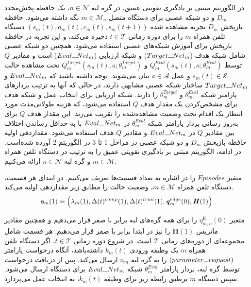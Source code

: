 در الگوریتم مبتنی بر یادگیری تقویتی عمیق، در گره لبه $n \in \mathcal{N}$، یک حافظه پخش‌مجدد $D_m$ و دو شبکه عصبی برای دستگاه متصل $m \in \mathcal{M}_n$ نگه داشته می‌شود. حافظه بازپخش $D_m$ تجربه مشاهده شده $(s_m(t), a_m(t), c_m(t), s_m(t+1))$ دستگاه تلفن همراه $m$ را برای دوره زمانی $t \in \mathcal{T}$ ذخیره می‌کند، و این تجربه در حافظه بازپخش برای آموزش شبکه‌های عصبی استفاده می‌شود. همچنین دو شبکه عصبی شامل شبکه هدف ($Target\rule{0.25cm}{0.15mm}Net_m$) و شبکه ارزیابی ($Eval\rule{0.25cm}{0.15mm}Net_m$) است و مقادیر $Q$ توسط $Q_m^{Eval}(s_m(t), a; \theta_m^{Eval})$ و $Q_m^{Target}(s_m(t), a; \theta_m^{Target})$ تحت مشاهده حالت $s_m(t) \in \mathcal{S}$ و عمل $a \in \mathcal{A}$ بیان می‌شوند. توجه داشته باشید که $Eval\rule{0.25cm}{0.15mm}Net_m$ و $Target\rule{0.25cm}{0.15mm}Net_m$ ساختار شبکه عصبی مشابهی دارند، در حالی که آنها به ترتیب بردارهای پارامتر شبکه $\theta_m^{Eval}$ و $ \theta_m^{Target}$ را دارند. شبکه ارزیابی برای انتخاب عمل و شبکه هدف برای مشخص‌کردن یک مقدار هدف $Q$ استفاده می‌شود، که هزینه طولانی‌مدت مورد انتظار یک اقدام تحت وضعیت مشاهده‌شده را تقریب می‌زند. این مقدار هدف $Q$ برای به‌روز رسانی بردار پارامتر شبکه $\theta_m^{Eval}$ در  $Eval\rule{0.25cm}{0.15mm}Net_m$ با به حداقل رساندن اختلاف بین مقادیر $Q$ در $Eval\rule{0.25cm}{0.15mm}Net_m$ و مقادیر $Q$ هدف استفاده می‌شود. مقداردهی اولیه حافظه بازپخش $D_m$ و دو شبکه عصبی در مراحل $1$ تا $3$ در الگوریتم $2$ آورده شده‌است. در ادامه، الگوریتم مبتنی بر یادگیری تقویتی عمیق را به ترتیب در دستگاه تلفن همراه $m \in \mathcal{M}$ و گره لبه $n \in \mathcal{N}$ ارائه می‌کنیم.


متغیر $Episodes$ را در اشاره به تعداد قسمت‌ها تعریف می‌کنیم. در ابتدای هر قسمت، دستگاه تلفن همراه $m \in \mathcal{M}$، وضعیت حالت را مطابق زیر مقداردهی اولیه می‌کند.
\begin{alignat}{2}
	\textbf{s}_m(1)=\Big(\lambda_m(1), \Delta(t)^{comp}(1), \Delta(t)^{tran}(1), \textbf{\textit{q}}_m^{edge}(0), \textbf{\textit{H}}(1) \Big)
	\label{61}  
\end{alignat} 



متغیر $\eta_{m,n}^{\text{E}}(0)$ را برای همه گره‌های لبه برابر با صفر قرار می‌دهیم و همچنین مقادیر ماتریس $\textbf{H}(1)$ را نیز در ابتدا برابر با صفر قرار می‌دهیم. هر قسمت شامل مجموعه‌ای از دوره‌های زمانی $\mathcal{T}$ است. 
در شروع دوره زمانی $t \in \mathcal{T}$، اگر دستگاه تلفن همراه $m$ یک وظیفه ورودی $k_m(t)$ داشته‌باشد، آنگاه درخواست پارامتر $(parameter \rule{0.25cm}{0.15mm} request)$ را به گره لبه $n_m$ ارسال می‌کند. پس از دریافت درخواست توسط گره لبه، بردار پارامتر $\theta_m^{Eval}$ شبکه $Eval\rule{0.25cm}{0.15mm}Net_m$ برای دستگاه ارسال می‌شود. سپس دستگاه $m$ برطبق رابطه زیر برای وظیفه $k_m(t)$، به انتخاب عمل می‌پردازد. 

